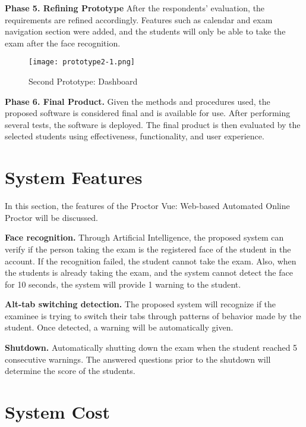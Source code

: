 \textbf{Phase 5. Refining Prototype}
After the respondents’ evaluation, the requirements are refined accordingly.
Features such as calendar and exam navigation section were added, and the students will only be able to take the exam after the face recognition.

\pagebreak

\begin{figure}[h!]
   \begin{center}
      \texttt{[image: prototype2-1.png]}
      \caption{Second Prototype: Dashboard}
   \end{center}
\end{figure}

\textbf{Phase 6. Final Product.}
Given the methods and procedures used, the proposed software is considered final and is available for use.
After performing several tests, the software is deployed.
The final product is then evaluated by the selected students using effectiveness, functionality, and user experience.

\section{System Features}

In this section, the features of the Proctor Vue: Web-based Automated Online Proctor will be discussed.

\textbf{Face recognition.}
Through Artificial Intelligence, the proposed system can verify if the person taking the exam is the registered face of the student in the account.
If the recognition failed, the student cannot take the exam.
Also, when the students is already taking the exam, and the system cannot detect the face for 10 seconds, the system will provide 1 warning to the student.

\textbf{Alt-tab switching detection.}
The proposed system will recognize if the examinee is trying to switch their tabs through patterns of behavior made by the student.
Once detected, a warning will be automatically given.

\textbf{Shutdown.}
Automatically shutting down the exam when the student reached 5 consecutive warnings.
The answered questions prior to the shutdown will determine the score of the students.

\section{System Cost}



